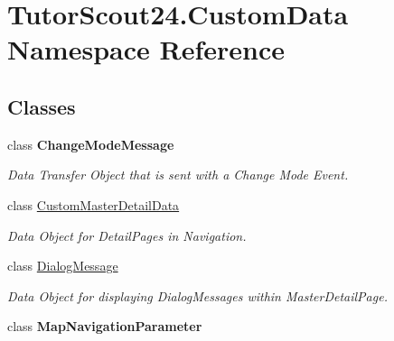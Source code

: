\hypertarget{namespace_tutor_scout24_1_1_custom_data}{}\section{Tutor\+Scout24.\+Custom\+Data Namespace Reference}
\label{namespace_tutor_scout24_1_1_custom_data}
\subsection*{Classes}
\begin{DoxyCompactItemize}
\item 
class {\bfseries Change\+Mode\+Message}
\begin{DoxyCompactList}\small\item\em Data Transfer Object that is sent with a Change Mode Event. \end{DoxyCompactList}\item 
class \mbox{\hyperlink{class_tutor_scout24_1_1_custom_data_1_1_custom_master_detail_data}{Custom\+Master\+Detail\+Data}}
\begin{DoxyCompactList}\small\item\em Data Object for Detail\+Pages in Navigation. \end{DoxyCompactList}\item 
class \mbox{\hyperlink{class_tutor_scout24_1_1_custom_data_1_1_dialog_message}{Dialog\+Message}}
\begin{DoxyCompactList}\small\item\em Data Object for displaying Dialog\+Messages within Master\+Detail\+Page. \end{DoxyCompactList}\item 
class {\bfseries Map\+Navigation\+Parameter}
\end{DoxyCompactItemize}
